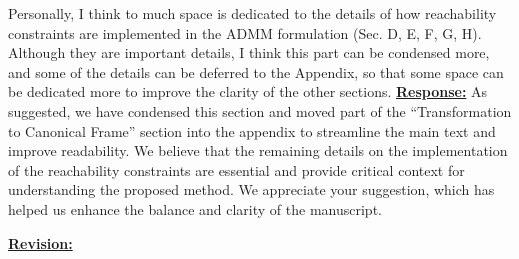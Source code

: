 \documentclass{article}
\newcommand{\rv}{{\large{\underline{\textbf{Revision:}}}}\quad}
\newcommand{\new}[1]{\textcolor{blue}{#1}}
\newcommand{\news}{\color{blue}}
\begin{document}


\begin{cmt}{}{}
	Personally, I think to much space is dedicated to the details of how
	reachability constraints are implemented in the ADMM formulation (Sec.
	D, E, F, G, H). Although they are important details, I think this part
	can be condensed more, and some of the details can be deferred to the
	Appendix, so that some space can be dedicated more to improve the
	clarity of the other sections.
	\tcblower
	\underline{\textbf{Response:}} As suggested, we have condensed this section and moved part of the “Transformation to Canonical Frame” section into the appendix to streamline the main text and improve readability. We believe that the remaining details on the implementation of the reachability constraints are essential and provide critical context for understanding the proposed method. We appreciate your suggestion, which has helped us enhance the balance and clarity of the manuscript. 
\end{cmt}
\rv
\renewcommand\thesubsection{D}
\end{document}
